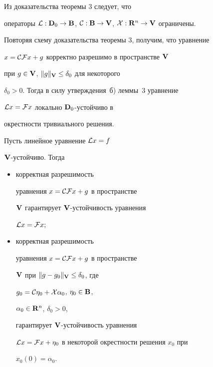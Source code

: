 \begin{pf}


Из доказательства теоремы 3 следует, что


операторы ${\cal L}:\spc{D}_0\to\spc{B}$, ${\cal


C}:\spc{B}\to\spc{V}$, ${\cal X}:\spc{R}^n\to\spc{V}$ ограничены.


Повторяя схему доказательства теоремы 3, получим, что уравнение


$x={\cal C}{\cal F}x+g$ корректно разрешимо в пространстве $\bold {V}$


при $g\in\bold {V}$, $\|g\|_{\bold V}\le\delta_0$ для некоторого


$\delta_0>0$. Тогда в силу утверждения~б) леммы~3 уравнение


${\cal L}x={\cal F}x$ локально $\bold {D}_0$-устойчиво в


окрестности тривиального решения.


\end{pf}





\begin{lem}


Пусть линейное уравнение ${\cal L}x=f$\;


$\bold {V}$-устойчиво. Тогда


\begin{itemize}


\item[а)] корректная разрешимость 


уравнения $x={\cal C}{\cal F}x+g$ в пространстве


$\bold {V}$ гарантирует $\bold {V}$-устойчивость уравнения


${\cal L}x={\cal F}x;$


\item[б)] корректная разрешимость 


уравнения $x={\cal C}{\cal F}x+g$ в пространстве


$\bold {V}$ при $\|g-g_0\|_{\bold V}\le\delta_0$, где


$g_0={\cal C}\eta_0+{\cal X}\alpha_0$, $\eta_0\in\bold {B}$,


$\alpha_0\in\bold {R}^n$, $\delta_0>0$,


гарантирует $\bold {V}$-устойчивость уравнения


${\cal L}x={\cal F}x+\eta_0$ в некоторой окрестности решения $x_0$ при


$x_0(0)=\alpha_0$.


\end{itemize}


\end{lem}





